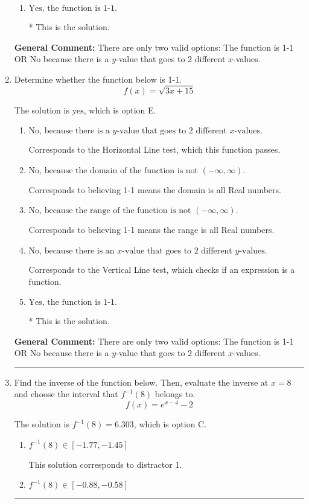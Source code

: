 \documentclass{extbook}[14pt]
\newcommand{\litem}[1]{\item #1

\rule{\textwidth}{0.4pt}}
\begin{document}
\begin{enumerate}
{\begin{enumerate}[label=\Alph*.]
Corresponds to believing 1-1 means the domain is all Real numbers.
\item \( \text{Yes, the function is 1-1.} \)

* This is the solution.
\end{enumerate}

\textbf{General Comment:} There are only two valid options: The function is 1-1 OR No because there is a $y$-value that goes to 2 different $x$-values.
}
\litem{
Determine whether the function below is 1-1.
\[ f(x) = \sqrt{3 x + 15} \]

The solution is \( \text{yes} \), which is option E.\begin{enumerate}[label=\Alph*.]
\item \( \text{No, because there is a $y$-value that goes to 2 different $x$-values.} \)

Corresponds to the Horizontal Line test, which this function passes.
\item \( \text{No, because the domain of the function is not $(-\infty, \infty)$.} \)

Corresponds to believing 1-1 means the domain is all Real numbers.
\item \( \text{No, because the range of the function is not $(-\infty, \infty)$.} \)

Corresponds to believing 1-1 means the range is all Real numbers.
\item \( \text{No, because there is an $x$-value that goes to 2 different $y$-values.} \)

Corresponds to the Vertical Line test, which checks if an expression is a function.
\item \( \text{Yes, the function is 1-1.} \)

* This is the solution.
\end{enumerate}

\textbf{General Comment:} There are only two valid options: The function is 1-1 OR No because there is a $y$-value that goes to 2 different $x$-values.
}
\litem{
Find the inverse of the function below. Then, evaluate the inverse at $x = 8$ and choose the interval that $f^{-1}(8)$ belongs to.
\[ f(x) = e^{x-4}-2 \]

The solution is \( f^{-1}(8) = 6.303 \), which is option C.\begin{enumerate}[label=\Alph*.]
\item \( f^{-1}(8) \in [-1.77, -1.45] \)

 This solution corresponds to distractor 1.
\item \( f^{-1}(8) \in [-0.88, -0.58] \)


\end{enumerate}}
\end{enumerate}
\end{document}
